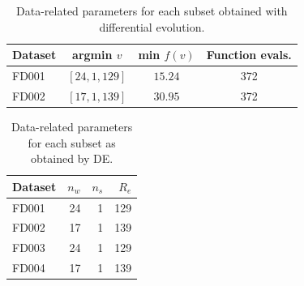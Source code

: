 \documentclass[12pt]{IEEEtran}%
\begin{document}
\begin{table}
\begin{center}
\caption
{Data-related parameters for each subset obtained with differential evolution.}%
%

\begin{tabular}
[c]{l|crr}\hline
Dataset & argmin $v$ & min $f(v)$ & Function evals.\\\hline\hline
FD001 & $\left[  24,1,129\right]  $ & \multicolumn{1}{c}{$15.24$} &
\multicolumn{1}{c}{372}\\
FD002 & $\left[  17,1,139\right]  $ & \multicolumn{1}{c}{$30.95$} &
\multicolumn{1}{c}{372}\\\hline
\end{tabular}
\label{table:optimal_data_params}%

\end{center}
\end{table}%
%

\begin{table}
\begin{center}
\caption{Data-related parameters for each subset as obtained by DE.}%
%

\begin{tabular}
[c]{lrrr}\hline
Dataset & $n_{w}$ & $n_{s}$ & $R_{e}$\\\hline\hline
FD001 & 24 & 1 & 129\\
FD002 & 17 & 1 & 139\\
FD003 & 24 & 1 & 129\\
FD004 & 17 & 1 & 139\\\hline
\end{tabular}
\label{table:data_params_de}%

\end{center}
\end{table}%
%
\end{document}
